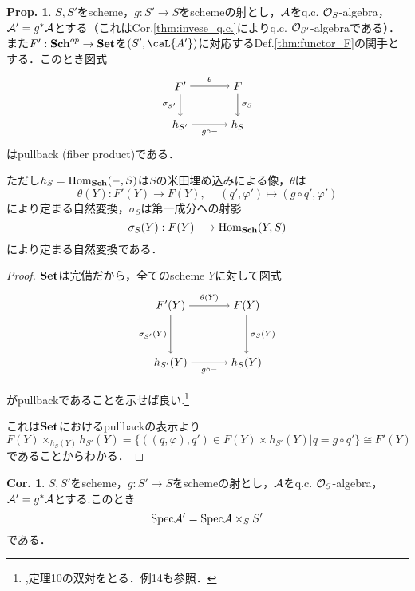 \documentclass[dvipdfmx,b5paper,papersize]{jsarticle}
\theoremstyle{definition}
\newtheorem{prop}[thm]{Prop.}
\newtheorem{cor}[thm]{Cor.}
\begin{document}
\begin{prop}\label{thm:pullback}
  $S,S'$をscheme，$g:S' \to S$をschemeの射とし，$\cal{A}$をq.c. ${\cal{O}}_S$-algebra，${\cal{A'}}=g^*{\cal{A}}$とする（これは{\rm Cor.\ref{thm:invese_q.c.}}によりq.c. ${\cal{O}}_{S'}$-algebraである）．また$F':{\bf Sch}^{op} \to {\bf Set}$を$(S',{\caL{A'}})$に対応する{\rm Def.\ref{thm:functor_F}}の関手とする．このとき図式
  \[
    \begin{tikzpicture}[auto,->]
      \node (a) at (0,1.2) {$F'$}; \node (x) at (1.8,1.2) {$F$};
      \node (b) at (0,0) {$h_{S'}$}; \node (y) at (1.8,0) {$h_{S}$};
      \draw (a) -- node {$\scriptstyle \theta$} (x);
      \draw (x) -- node {$\scriptstyle \sigma_{S}$} (y);
      \draw (a) -- node[swap] {$\scriptstyle \sigma_{S'}$} (b);
      \draw (b) -- node[swap] {$\scriptstyle g \circ -$} (y);
    \end{tikzpicture}
  \]
  はpullback (fiber product)である．

  ただし$h_{S}={\rm Hom}_{\bf Sch}(-,S)$は$S$の米田埋め込みによる像，$\theta$は
  \[
    \theta(Y):F'(Y) \longrightarrow F(Y), \hspace{15pt}(q',\varphi') \longmapsto (g \circ q',\varphi')
  \]
  により定まる自然変換，$\sigma_{S}$は第一成分への射影
  \[
    \sigma_S(Y):F(Y)\longrightarrow{\rm Hom}_{\bf Sch}(Y,S)
  \]
  により定まる自然変換である．
\end{prop}
\begin{proof}
  ${\bf Set}$は完備だから，全てのscheme $Y$に対して図式
  \[
    \begin{tikzpicture}[auto,->]
      \node (a) at (0,1.8) {$F'(Y)$}; \node (x) at (2.4,1.8) {$F(Y)$};
      \node (b) at (0,0) {$h_{S'}(Y)$}; \node (y) at (2.4,0) {$h_{S}(Y)$};
      \draw (a) -- node {$\scriptstyle \theta(Y)$} (x);
      \draw (x) -- node {$\scriptstyle \sigma_{S}(Y)$} (y);
      \draw (a) -- node[swap] {$\scriptstyle \sigma_{S'}(Y)$} (b);
      \draw (b) -- node[swap] {$\scriptstyle g \circ -$} (y);
    \end{tikzpicture}
  \]

  がpullbackであることを示せば良い.\footnote{\cite{alg_d},定理10の双対をとる．例14も参照．}

  これは${\bf Set}$におけるpullbackの表示より
  \[
    F(Y)\times_{h_S(Y)} h_{S'}(Y)=\{((q,\varphi),q')\in F(Y)\times h_{S'}(Y)|q=g\circ q'\} \cong F'(Y)
  \]
  であることからわかる．
\end{proof}
\begin{cor}
  $S,S'$をscheme，$g:S' \to S$をschemeの射とし，$\cal{A}$をq.c. ${\cal{O}}_S$-algebra，${\cal{A'}}=g^*{\cal{A}}$とする.このとき
  \[
  {\rm Spec}{\cal{A'}}={\rm Spec}{\cal{A}}\times_S S'
  \]
  である．
\end{cor}
\end{document}

